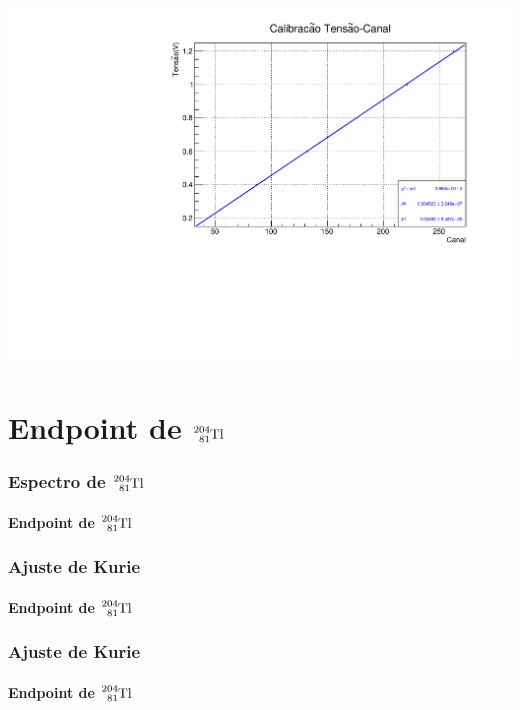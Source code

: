 \documentclass{beamer}
\begin{document}
\begin{frame}
{\begin{tabular}{l|llll}
                                 \hline  
                                 \hline
        \end{tabular}}
     \includegraphics[scale=0.25]{calib2.pdf}

\end{frame}

\section{Endpoint de $\ce{^{204}_{81}Tl}$}
\begin{frame}\frametitle{Espectro de $\ce{^{204}_{81}Tl}$}\framesubtitle{Endpoint de $\ce{^{204}_{81}Tl}$}

  \begin{block}

  \end{block}

\end{frame}

\begin{frame}\frametitle{Ajuste de Kurie}\framesubtitle{Endpoint de $\ce{^{204}_{81}Tl}$}

  \begin{block}

  \end{block}

\end{frame}

\begin{frame}\frametitle{Ajuste de Kurie}\framesubtitle{Endpoint de $\ce{^{204}_{81}Tl}$}

  \begin{block}

  \end{block}

\end{frame}
\end{document}
